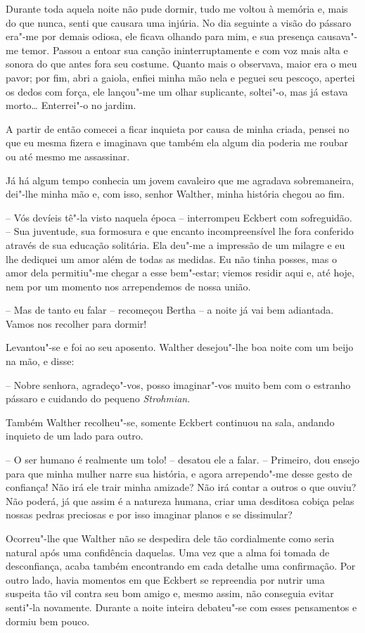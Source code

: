  Durante toda aquela noite não pude dormir, tudo me voltou à memória e,
mais do que nunca, senti que causara uma injúria. No dia seguinte a
visão do pássaro era"-me por demais odiosa, ele ficava olhando para mim,
e sua presença causava"-me temor. Passou a entoar sua canção
ininterruptamente e com voz mais alta e sonora do que antes fora seu
costume. Quanto mais o observava, maior era o meu pavor; por fim, abri
a gaiola, enfiei minha mão nela e peguei seu pescoço, apertei os dedos
com força, ele lançou"-me um olhar suplicante, soltei"-o, mas já estava
morto\ldots{} Enterrei"-o no jardim.

 A partir de então comecei a ficar inquieta por causa de minha criada,
pensei no que eu mesma fizera e imaginava que também ela algum dia
poderia me roubar ou até mesmo me assassinar. 

Já há algum tempo conhecia um jovem cavaleiro que me agradava
sobremaneira, dei"-lhe minha mão e, com isso, senhor Walther, minha
história chegou ao fim.

 -- Vós devíeis tê"-la visto naquela época -- interrompeu Eckbert com
sofreguidão. -- Sua juventude, sua formosura e que encanto incompreensível
lhe fora conferido através de sua educação solitária. Ela deu"-me a
impressão de um milagre e eu lhe dediquei um amor além de todas as
medidas. Eu não tinha posses, mas o amor dela permitiu"-me chegar a esse
bem"-estar; viemos residir aqui e, até hoje, nem por um momento nos
arrependemos de nossa união.

 -- Mas de tanto eu falar -- recomeçou Bertha -- a noite já vai bem
adiantada. Vamos nos recolher para dormir!

 Levantou"-se e foi ao seu aposento. Walther desejou"-lhe boa noite com um
beijo na mão, e disse:

-- Nobre senhora, agradeço"-vos, posso imaginar"-vos muito bem com o
estranho pássaro e cuidando do pequeno \textit{Strohmian}.

 Também Walther recolheu"-se, somente Eckbert continuou na sala, andando
inquieto de um lado para outro. 

-- O ser humano é realmente um tolo! -- desatou ele a falar. --
Primeiro, dou ensejo para que minha mulher narre sua história, e agora
arrependo"-me desse gesto de confiança! Não irá ele trair minha
amizade? Não irá contar a outros o que ouviu? Não poderá, já que assim
é a natureza humana, criar uma desditosa cobiça pelas nossas pedras
preciosas e por isso imaginar planos e se dissimular?

 Ocorreu"-lhe que Walther não se despedira dele tão cordialmente como
seria natural após uma confidência daquelas. Uma vez que a alma foi
tomada de desconfiança, acaba também encontrando em cada detalhe uma
confirmação. Por outro lado, havia momentos em que Eckbert se
repreendia por nutrir uma suspeita tão vil contra seu bom amigo e,
mesmo assim, não conseguia evitar senti"-la novamente. Durante a
noite inteira debateu"-se com esses pensamentos e dormiu bem pouco.

